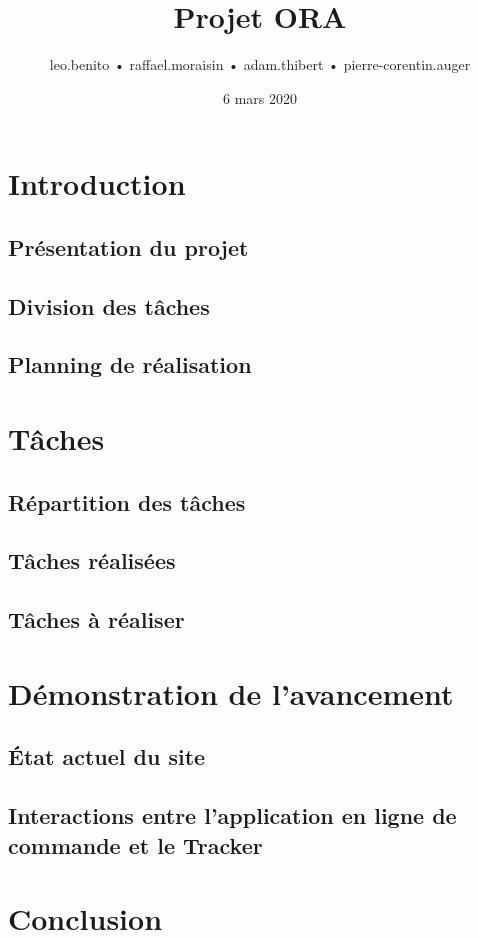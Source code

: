 \documentclass[11pt, a4paper]{outline}
\title{Projet ORA}
\author{leo.benito  •  raffael.moraisin  •  adam.thibert  •  pierre-corentin.auger}
\date{6 mars 2020}
\begin{document}
  
  \tableofcontents
  \thispagestyle{empty}

  \clearpage
 
  \section{Introduction}
    \subsection{Présentation du projet}
    \subsection{Division des tâches}
    \subsection{Planning de réalisation}
    
  \section{Tâches}
    \subsection{Répartition des tâches}
    \subsection{Tâches réalisées}
    \subsection{Tâches à réaliser}
    
  \section{Démonstration de l'avancement}
    \subsection{État actuel du site}
    \subsection{Interactions entre l'application en ligne de commande et le Tracker}

  \section{Conclusion}
\end{document}
